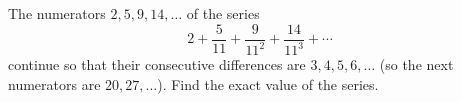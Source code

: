 The numerators $2,5,9,14,\dots$ of the series
\[
2+\dfrac{5}{11}+\dfrac{9}{11^2}+\dfrac{14}{11^3}+\cdots
\]
continue so that their consecutive differences are $3,4,5,6,\dots$ (so the next numerators are $20,27,\dots$). Find the exact value of the series.
